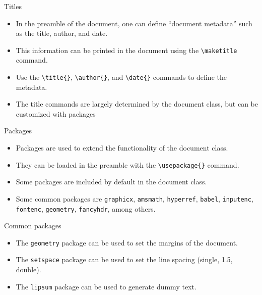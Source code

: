 \documentclass[t,12pt,xcolor=dvipsnames]{beamer}
\begin{document}
\begin{frame}{Titles}
    \begin{itemize}
        \item In the preamble of the document, one can define \enquote{document metadata} such as the title, author, and date.
        \item This information can be printed in the document using the \texttt{\textbackslash maketitle} command.
        \item Use the \texttt{\textbackslash title\{\}}, \texttt{\textbackslash author\{\}}, and \texttt{\textbackslash date\{\}} commands to define the metadata.
        \item The title commands are largely determined by the document class, but can be customized with packages
    \end{itemize}
\end{frame}
\begin{frame}{Packages}
    \begin{itemize}
        \item Packages are used to extend the functionality of the document class.
        \item They can be loaded in the preamble with the \texttt{\textbackslash usepackage\{\}} command.
        \item Some packages are included by default in the document class.
        \item Some common packages are \texttt{graphicx}, \texttt{amsmath}, \texttt{hyperref}, \texttt{babel}, \texttt{inputenc}, \texttt{fontenc}, \texttt{geometry}, \texttt{fancyhdr}, among others.
    \end{itemize}
\end{frame}

\begin{frame}{Common packages}
    \begin{itemize}
        \item The \texttt{geometry} package can be used to set the margins of the document.
        \item The \texttt{setspace} package can be used to set the line spacing (single, 1.5, double).
        \item The \texttt{lipsum} package can be used to generate dummy text. 
    \end{itemize}
\end{frame}
\end{document}
